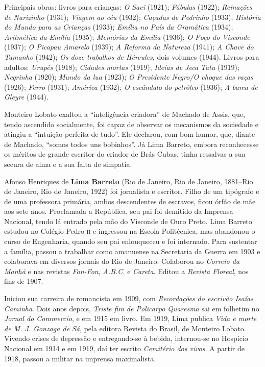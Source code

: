 Principais obras: livros para crianças: \emph{O Saci} (1921);
\emph{Fábulas} (1922); \emph{Reinações de Narizinho} (1931);
\emph{Viagem ao céu} (1932); \emph{Caçadas de Pedrinho} (1933);
\emph{História do Mundo para as} \emph{Crianças} (1933); \emph{Emília no
País da Gramática} (1934); \emph{Aritmética da Emília} (1935);
\emph{Memórias da Emília} (1936); \emph{O Poço do Visconde} (1937);
\emph{O Picapau Amarelo} (1939); \emph{A Reforma da Natureza} (1941);
\emph{A Chave do Tamanho} (1942); \emph{Os doze trabalhos de Hércules},
dois volumes (1944). Livros para adultos: \emph{Urupês} (1918);
\emph{Cidades} \emph{mortas} (1919); \emph{Ideias de Jeca Tatu} (1919);
\emph{Negrinha} (1920); \emph{Mundo da lua} (1923); \emph{O Presidente
Negro/O choque das raças} (1926); \emph{Ferro} (1931); \emph{América}
(1932); \emph{O escândalo do petróleo} (1936); \emph{A barca de Gleyre}
(1944).

Monteiro Lobato exaltou a ``inteligência criadora'' de Machado de Assis,
que, tendo ascendido socialmente, foi capaz de observar os mecanismos da
sociedade e atingiu a ``intuição perfeita de tudo''. Ele declarou, com
bom humor, que, diante de Machado, ``somos todos uns bobinhos''. Já Lima
Barreto, embora reconhecesse os méritos de grande escritor do criador de
Brás Cubas, tinha ressalvas a sua secura de alma e a sua falta de
simpatia.


Afonso Henriques de \textbf{Lima Barreto} (Rio de Janeiro, Rio de
Janeiro, 1881--Rio de Janeiro, Rio de Janeiro, 1922) foi jornalista e
escritor. Filho de um tipógrafo e de uma professora primária, ambos
descendentes de escravos, ficou órfão de mãe aos sete anos. Proclamada a
República, seu pai foi demitido da Imprensa Nacional, tendo lá entrado
pela mão do Visconde de Ouro Preto. Lima Barreto estudou no Colégio
Pedro \textsc{ii} e ingressou na Escola Politécnica, mas abandonou o curso de
Engenharia, quando seu pai enlouqueceu e foi internado. Para sustentar a
família, passou a trabalhar como amanuense na Secretaria da Guerra em
1903 e colaborava em diversos jornais do Rio de Janeiro. Colaborou no
\emph{Correio da Manhã} e nas revistas \emph{Fon-Fon}, \emph{A.B.C.} e
\emph{Careta}. Editou a \emph{Revista Floreal}, nos fins de 1907.

Iniciou sua carreira de romancista em 1909, com \emph{Recordações do
escrivão Isaías Caminha}. Dois anos depois, \emph{Triste fim de
Policarpo Quaresma} sai em folhetim no \emph{Jornal do Commercio}, e em
1915 em livro. Em 1919, Lima publica \emph{Vida e morte de M. J. Gonzaga
de Sá}, pela editora Revista do Brasil, de Monteiro Lobato. Vivendo
crises de depressão e entregando-se à bebida, internou-se no Hospício
Nacional em 1914 e em 1919, daí ter escrito \emph{Cemitério dos vivos}.
A partir de 1918, passou a militar na imprensa maximalista.

